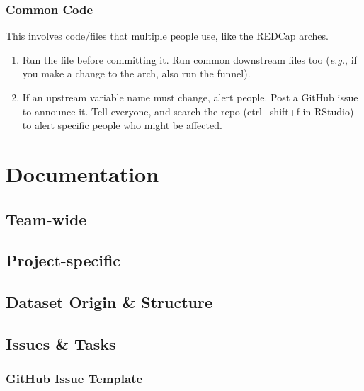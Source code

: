 \documentclass[
]{book}
\providecommand{\tightlist}{%
  \setlength{\itemsep}{0pt}\setlength{\parskip}{0pt}}
\begin{document}
\hypertarget{common-code}{%
\subsection{Common Code}\label{common-code}}

This involves code/files that multiple people use, like the REDCap arches.

\begin{enumerate}
\def\labelenumi{\arabic{enumi}.}
\tightlist
\item
  Run the file before committing it. Run common downstream files too (\emph{e.g.}, if you make a change to the arch, also run the funnel).
\item
  If an upstream variable name must change, alert people. Post a GitHub issue to announce it. Tell everyone, and search the repo (ctrl+shift+f in RStudio) to alert specific people who might be affected.
\end{enumerate}

\hypertarget{document}{%
\chapter{Documentation}\label{document}}

\hypertarget{team-wide}{%
\section{Team-wide}\label{team-wide}}

\hypertarget{project-specific}{%
\section{Project-specific}\label{project-specific}}

\hypertarget{dataset-origin-structure}{%
\section{Dataset Origin \& Structure}\label{dataset-origin-structure}}

\hypertarget{issues-tasks}{%
\section{Issues \& Tasks}\label{issues-tasks}}

\hypertarget{documentation-issue-template}{%
\subsection{GitHub Issue Template}\label{documentation-issue-template}}
\end{document}
